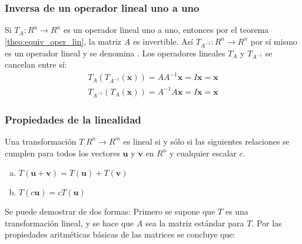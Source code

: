 \documentclass[a4paper,12pt]{article}
\begin{document}
\subsubsection{Inversa de un operador lineal uno a uno}

Si $T_A:R^n\rightarrow R^n$ es un operador lineal uno a uno, entonces por el
teorema \ref{theo:equiv_oper_lin}, la matriz $A$ es invertible. Así
$T_{A^{-1}}:R^n\rightarrow R^n$ por sí mismo es un operador lineal y se
denomina . Los operadores lineales $T_A$ y $T_{A^{-1}}$
se cancelan entre sí:
\begin{align*}
  T_A(T_{A^{-1}}(\mathbf{x}))=AA^{-1}\mathbf{x}=I\mathbf{x}=\mathbf{x} \\
  T_{A^{-1}}(T_A(\mathbf{x}))=A^{-1}A\mathbf{x}=I\mathbf{x}=\mathbf{x}
\end{align*}

\subsubsection{Propiedades de la linealidad}

\begin{theorem}
  Una transformación $T_:R^n\rightarrow R^m$ es lineal si y sólo si las
  siguientes relaciones se cumplen para todos los vectores $\mathbf{u}$ y
  $\mathbf{v}$ en $R^n$ y cualquier escalar $c$.
  \begin{enumerate}[(a)]
    \item $T(\mathbf{u}+\mathbf{v})=T(\mathbf{u})+T(\mathbf{v})$
    \item $T(c\mathbf{u})=cT(\mathbf{u})$
  \end{enumerate}
  \label{theo:transf_lineal}
\end{theorem}

\demo Se puede demostrar de dos formas:
Primero se supone que $T$ es una transformación lineal, y se hace que $A$ sea
la matriz estándar para $T$. Por las propiedades aritméticas básicas de las
matrices se concluye que:
\end{document}
